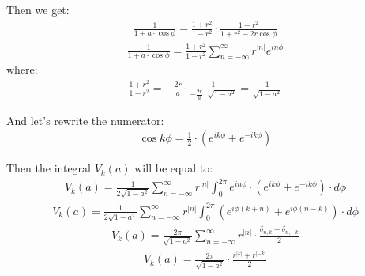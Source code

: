 Then we get:
\begin{equation*}\begin{aligned}
\frac{1}{1 + a \cdot\cos \phi} = \frac{1 + r^2}{1 - r^2} \cdot \frac{1-r^2}{1 + r^2 - 2r\cos \phi}
\end{aligned}\end{equation*}
\begin{equation}\begin{aligned}
\frac{1}{1 + a \cdot\cos \phi} = \frac{1 + r^2}{1 - r^2} \sum_{n = -\infty}^{\infty} r^{|n|} e^{in\phi}
\end{aligned}\end{equation}
where: 
\begin{equation*}\begin{aligned}
\frac{1 + r^2}{1 - r^2} = - \frac{2r}{a} \cdot \frac{1}{- \frac{2r}{a} \cdot \sqrt{1 - a^2}} = \frac{1}{\sqrt{1 - a^2}}
\end{aligned}\end{equation*}

And let's rewrite the numerator:
\begin{equation*}\begin{aligned}
\cos k \phi = \frac{1}{2} \cdot(e^{ik\phi} + e^{-ik\phi})
\end{aligned}\end{equation*}

Then the integral $V_k(a)$ will be equal to:
\begin{equation*}\begin{aligned}
V_k(a) = \frac{1}{2\sqrt{1 - a^2}} \sum_{n = -\infty}^{\infty} r^{|n|} \int_{0}^{2 \pi} e^{in\phi} \cdot(e^{ik\phi} + e^{-ik\phi}) \cdot d\phi
\end{aligned}\end{equation*}
\begin{equation*}\begin{aligned}
V_k(a) = \frac{1}{2\sqrt{1 - a^2}} \sum_{n = -\infty}^{\infty} r^{|n|} \int_{0}^{2 \pi} (e^{i\phi(k+n)} + e^{i\phi(n-k)}) \cdot d\phi
\end{aligned}\end{equation*}
\begin{equation*}\begin{aligned}
V_k(a) = \frac{2\pi}{\sqrt{1 - a^2}} \sum_{n = -\infty}^{\infty} r^{|n|} \cdot \frac{\delta_{n,k} + \delta_{n,-k}}{2}  
\end{aligned}\end{equation*}
\begin{equation*}\begin{aligned}
V_k(a) = \frac{2\pi}{\sqrt{1 - a^2}} \cdot \frac{r^{|k|} + r^{|-k|}}{2}
\end{aligned}\end{equation*}

